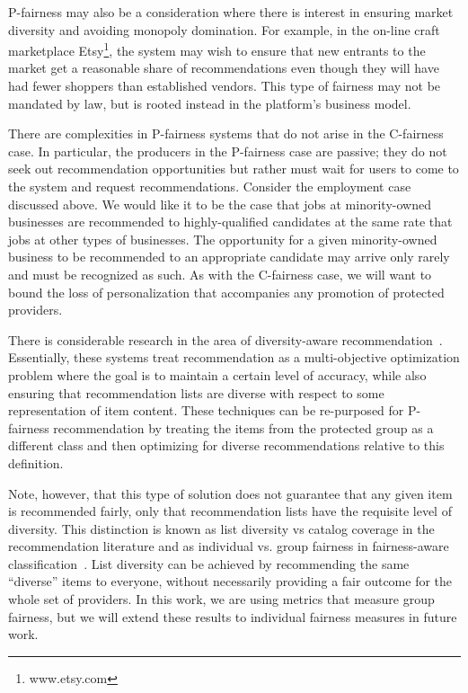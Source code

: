 P-fairness may also be a consideration where there is interest in ensuring market diversity and avoiding monopoly domination. For example, in the on-line craft marketplace Etsy\footnote{www.etsy.com}, the system may wish to ensure that new entrants to the market get a reasonable share of recommendations even though they will have had fewer shoppers than established vendors. This type of fairness may not be mandated by law, but is rooted instead in the platform's business model.

There are complexities in P-fairness systems that do not arise in the C-fairness case. In particular, the producers in the P-fairness case are passive; they do not seek out recommendation opportunities but rather must wait for users to come to the system and request recommendations. Consider the employment case discussed above. We would like it to be the case that jobs at minority-owned businesses are recommended to highly-qualified candidates at the same rate that jobs at other types of businesses. The opportunity for a given minority-owned business to be recommended to an appropriate candidate may arrive only rarely and must be recognized as such. As with the C-fairness case, we will want to bound the loss of personalization that accompanies any promotion of protected providers. 

There is considerable research in the area of diversity-aware recommendation~\cite{Vargas:2011:RRN:2043932.2043955,adomavicius2012improving}. Essentially, these systems treat recommendation as a multi-objective optimization problem where the goal is to maintain a certain level of accuracy, while also ensuring that recommendation lists are diverse with respect to some representation of item content. These techniques can be re-purposed for P-fairness recommendation by treating the items from the protected group as a different class and then optimizing for diverse recommendations relative to this definition.

Note, however, that this type of solution does not guarantee that any given item is recommended fairly, only that recommendation lists have the requisite level of diversity. This distinction is known as list diversity vs catalog coverage in the recommendation literature and as individual vs. group fairness in fairness-aware classification~\cite{fairness}. List diversity can be achieved by recommending the same ``diverse'' items to everyone, without necessarily providing a fair outcome for the whole set of providers. In this work, we are using metrics that measure group fairness, but we will extend these results to individual fairness measures in future work.
